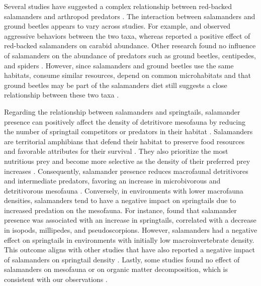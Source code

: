 Several studies have suggested a complex relationship between red-backed salamanders and arthropod predators \citep{Gall2003BehavioralInteractions,Walton2006Salamandersforestfloor,Hickerson2018Behavioralinteractions}. 
The interaction between salamanders and ground beetles appears to vary across studies.  
For example, \cite{Gall2003BehavioralInteractions} and \cite{Ovaska1988Predatorybehavior} observed aggressive behaviors between the two taxa, whereas \cite{Hickerson2012Interactionsforestfloor} reported a positive effect of red-backed salamanders on carabid abundance. 
Other research found no influence of salamanders on the abundance of predators such as ground beetles, centipedes, and spiders \citep{Hocking2013Effectsexperimental}. 
However, since salamanders and ground beetles use the same habitats, consume similar resources, depend on common microhabitats and that ground beetles may be part of the salamanders diet still suggests a close relationship between these two taxa \citep{Jaeger1980MicrohabitatsTerrestrial,loveiEcologyBehaviorGround1996}.

Regarding the relationship between salamanders and springtails, salamander presence can positively affect the density of detritivore mesofauna by reducing the number of springtail competitors or predators in their habitat \citep{Wyman1998Experimentalassessment,Rooney2000impactsalamander,Walton2005Contrastingeffects,Walton2006Salamandersforestfloor}. 
Salamanders are territorial amphibians that defend their habitat to preserve food resources and favorable attributes for their survival \citep{Gall2003BehavioralInteractions,Hickerson2004Behavioralinteractions,Hickerson2012Interactionsforestfloor}. 
They also prioritize the most nutritious prey and become more selective as the density of their preferred prey increases \citep{Jaeger1981Foragingtactics,Jaeger1982ForagingTactics}. 
Consequently, salamander presence reduces macrofaunal detritivores and intermediate predators, favoring an increase in microbivorous and detritivorous mesofauna \citep{Rooney2000impactsalamander,Walton2005Contrastingeffects,Walton2006Salamandersforestfloor}. 
Conversely, in environments with lower macrofauna densities, salamanders tend to have a negative impact on springtails due to increased predation on the mesofauna. 
For instance, \cite{Walton2006Salamandersforestfloor} found that salamander presence was associated with an increase in springtails, correlated with a decrease in isopods, millipedes, and pseudoscorpions.  
However, salamanders had a negative effect on springtails in environments with initially low macroinvertebrate density. 
This outcome aligns with other studies that have also reported a negative impact of salamanders on springtail density \citep{Hickerson2017Easternredbacked}. 
Lastly, some studies found no effect of salamanders on mesofauna or on organic matter decomposition, which is consistent with our observations \citep{Hocking2013Effectsexperimental,Hocking2014Effectsredbacked}.

